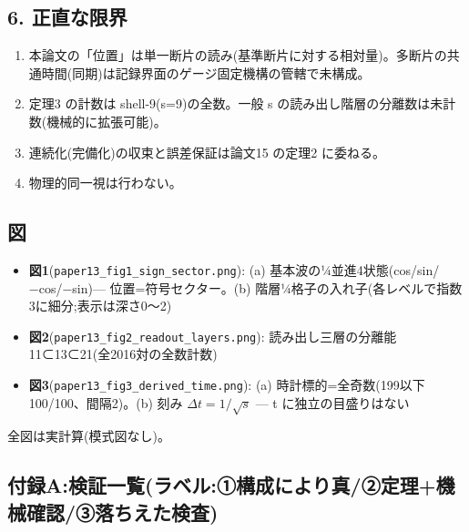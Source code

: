 \documentclass[
]{ltjsarticle}
\providecommand{\tightlist}{%
  \setlength{\itemsep}{0pt}\setlength{\parskip}{0pt}}
\begin{document}
\subsection{6. 正直な限界}\label{ux6b63ux76f4ux306aux9650ux754c}

\begin{enumerate}
\def\labelenumi{\arabic{enumi}.}
\tightlist
\item
  本論文の「位置」は単一断片の読み(基準断片に対する相対量)。多断片の共通時間(同期)は記録界面のゲージ固定機構の管轄で未構成。
\item
  定理3 の計数は shell-9(s=9)の全数。一般 s
  の読み出し階層の分離数は未計数(機械的に拡張可能)。
\item
  連続化(完備化)の収束と誤差保証は論文15 の定理2 に委ねる。
\item
  物理的同一視は行わない。
\end{enumerate}

\subsection{図}\label{ux56f3}

\begin{itemize}
\tightlist
\item
  \textbf{図1}(\texttt{paper13\_fig1\_sign\_sector.png}): (a)
  基本波の¼並進4状態(cos/sin/−cos/−sin)--- 位置=符号セクター。(b)
  階層¼格子の入れ子(各レベルで指数3に細分;表示は深さ0〜2)
\item
  \textbf{図2}(\texttt{paper13\_fig2\_readout\_layers.png}):
  読み出し三層の分離能 11⊂13⊂21(全2016対の全数計数)
\item
  \textbf{図3}(\texttt{paper13\_fig3\_derived\_time.png}): (a)
  時計標的=全奇数(199以下 100/100、間隔2)。(b) 刻み
  \(\Delta t=1/\sqrt{s}\) --- t に独立の目盛りはない
\end{itemize}

全図は実計算(模式図なし)。

\subsection{付録A:検証一覧(ラベル:①構成により真/②定理+機械確認/③落ちえた検査)}\label{ux4ed8ux9332aux691cux8a3cux4e00ux89a7ux30e9ux30d9ux30ebux2460ux69cbux6210ux306bux3088ux308aux771fux2461ux5b9aux7406ux6a5fux68b0ux78baux8a8dux2462ux843dux3061ux3048ux305fux691cux67fb}
\end{document}
